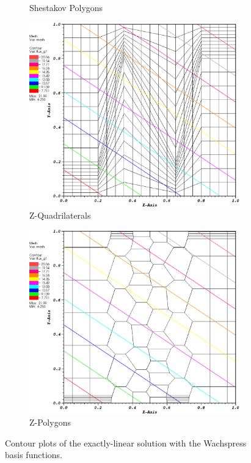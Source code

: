 \begin{figure}
{\begin{subfigure}[b]{0.45\textwidth}
		\caption{Shestakov Polygons}
	\end{subfigure}
}
\vspace{3mm}
{
	\begin{subfigure}[b]{0.45\textwidth}
		\centering
		\label{subfig::z_quad_wach_lin_sol}
		\includegraphics[width=\textwidth]{figures/sec_BF/z_quad_WACHSPRESS_k1.eps}
		\caption{Z-Quadrilaterals}
	\end{subfigure}
	\hfill
	\begin{subfigure}[b]{0.45\textwidth}
		\centering
		\label{subfig::z_poly_wach_lin_sol}
		\includegraphics[width=\textwidth]{figures/sec_BF/z_poly_WACHSPRESS_k1.eps}
		\caption{Z-Polygons}
	\end{subfigure}
}
\caption{Contour plots of the exactly-linear solution with the Wachspress basis functions.}
\label{fig::BF_Results_Linear_wach_sol}
\end{figure}

